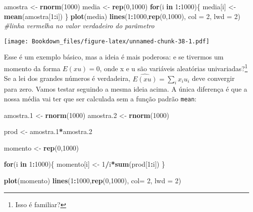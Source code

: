 \documentclass[]{book}
\newenvironment{Shaded}{\begin{snugshade}}{\end{snugshade}}
\newcommand{\KeywordTok}[1]{\textcolor[rgb]{0.13,0.29,0.53}{\textbf{#1}}}
\newcommand{\DataTypeTok}[1]{\textcolor[rgb]{0.13,0.29,0.53}{#1}}
\newcommand{\DecValTok}[1]{\textcolor[rgb]{0.00,0.00,0.81}{#1}}
\newcommand{\StringTok}[1]{\textcolor[rgb]{0.31,0.60,0.02}{#1}}
\newcommand{\CommentTok}[1]{\textcolor[rgb]{0.56,0.35,0.01}{\textit{#1}}}
\newcommand{\ControlFlowTok}[1]{\textcolor[rgb]{0.13,0.29,0.53}{\textbf{#1}}}
\newcommand{\OperatorTok}[1]{\textcolor[rgb]{0.81,0.36,0.00}{\textbf{#1}}}
\newcommand{\NormalTok}[1]{#1}
\let\rmarkdownfootnote\footnote%
\def\footnote{\protect\rmarkdownfootnote}
\begin{document}
\begin{Shaded}
\begin{Highlighting}[]
\NormalTok{amostra <-}\StringTok{ }\KeywordTok{rnorm}\NormalTok{(}\DecValTok{1000}\NormalTok{)}
\NormalTok{media <-}\StringTok{ }\KeywordTok{rep}\NormalTok{(}\DecValTok{0}\NormalTok{,}\DecValTok{1000}\NormalTok{)}
\ControlFlowTok{for}\NormalTok{(i }\ControlFlowTok{in} \DecValTok{1}\OperatorTok{:}\DecValTok{1000}\NormalTok{)\{}
\NormalTok{  media[i] <-}\StringTok{ }\KeywordTok{mean}\NormalTok{(amostra[}\DecValTok{1}\OperatorTok{:}\NormalTok{i])}
\NormalTok{\}}
\KeywordTok{plot}\NormalTok{(media)}
\KeywordTok{lines}\NormalTok{(}\DecValTok{1}\OperatorTok{:}\DecValTok{1000}\NormalTok{,}\KeywordTok{rep}\NormalTok{(}\DecValTok{0}\NormalTok{,}\DecValTok{1000}\NormalTok{), }\DataTypeTok{col =} \DecValTok{2}\NormalTok{, }\DataTypeTok{lwd =} \DecValTok{2}\NormalTok{) }\CommentTok{#linha vermelha no valor verdadeiro do parâmetro}
\end{Highlighting}
\end{Shaded}

\texttt{[image: Bookdown\_files/figure-latex/unnamed-chunk-38-1.pdf]}

Esse é um exemplo básico, mas a ideia é mais poderosa: e se tivermos um
momento da forma \(E(xu)=0\), onde x e u são variáveis aleatórias
univariadas?\footnote{Isso é familiar?} Se a lei dos grandes números é
verdadeira, \(\widehat{E(xu)} = \sum_i x_i u_i\) deve convergir para
zero. Vamos testar seguindo a mesma ideia acima. A única diferença é que
a nossa média vai ter que ser calculada sem a função padrão
\texttt{mean}:

\begin{Shaded}
\begin{Highlighting}[]
\NormalTok{amostra.}\DecValTok{1}\NormalTok{ <-}\StringTok{ }\KeywordTok{rnorm}\NormalTok{(}\DecValTok{1000}\NormalTok{)}
\NormalTok{amostra.}\DecValTok{2}\NormalTok{ <-}\StringTok{ }\KeywordTok{rnorm}\NormalTok{(}\DecValTok{1000}\NormalTok{)}

\NormalTok{prod <-}\StringTok{ }\NormalTok{amostra.}\DecValTok{1}\OperatorTok{*}\NormalTok{amostra.}\DecValTok{2}

\NormalTok{momento <-}\StringTok{ }\KeywordTok{rep}\NormalTok{(}\DecValTok{0}\NormalTok{,}\DecValTok{1000}\NormalTok{)}

\ControlFlowTok{for}\NormalTok{(i }\ControlFlowTok{in} \DecValTok{1}\OperatorTok{:}\DecValTok{1000}\NormalTok{)\{}
\NormalTok{  momento[i] <-}\StringTok{ }\DecValTok{1}\OperatorTok{/}\NormalTok{i}\OperatorTok{*}\KeywordTok{sum}\NormalTok{(prod[}\DecValTok{1}\OperatorTok{:}\NormalTok{i])}
\NormalTok{\}}

\KeywordTok{plot}\NormalTok{(momento)}
\KeywordTok{lines}\NormalTok{(}\DecValTok{1}\OperatorTok{:}\DecValTok{1000}\NormalTok{,}\KeywordTok{rep}\NormalTok{(}\DecValTok{0}\NormalTok{,}\DecValTok{1000}\NormalTok{), }\DataTypeTok{col=} \DecValTok{2}\NormalTok{, }\DataTypeTok{lwd =} \DecValTok{2}\NormalTok{)}
\end{Highlighting}
\end{Shaded}
\end{document}
